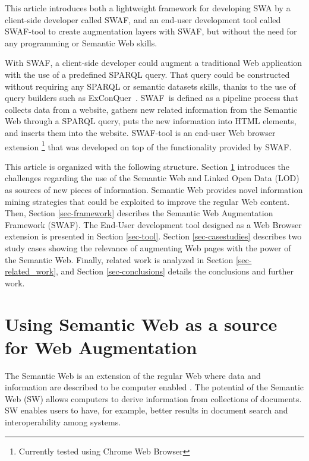 \documentclass[runningheads]{llncs}
\newcommand{\SWAT}{SWAF}
\begin{document}
This article introduces both a lightweight framework for developing SWA by a client-side developer called SWAF, and an end-user development tool called SWAF-tool to create augmentation layers with SWAF, but without the need for any programming or Semantic Web skills.

With \SWAT, a client-side developer could augment a traditional Web application with the use of a predefined SPARQL query. That query could be constructed without requiring any SPARQL or semantic datasets skills, thanks to the use of query builders such as ExConQuer~\cite{Attard2017ExConQuerRe-use}. \SWAT~is defined as a pipeline process that collects data from a website, gathers new related information from the Semantic Web through a SPARQL query, puts the new information into HTML elements, and inserts them into the website. SWAF-tool is an end-user Web browser extension \footnote{Currently tested using Chrome Web Browser} that was developed on top of the functionality provided by SWAF.


This article is organized with the following structure. Section \ref{sec-challenges} introduces the challenges regarding the use of the Semantic Web and Linked Open Data (LOD) as sources of new pieces of information. Semantic Web provides novel information mining strategies that could be exploited to improve the regular Web content. Then, Section \ref{sec-framework} describes the Semantic Web Augmentation Framework (SWAF). The End-User development tool designed as a Web Browser extension is presented in Section \ref{sec-tool}. Section \ref{sec-casestudies} describes two study cases showing the relevance of augmenting Web pages with the power of the Semantic Web. Finally, related work is analyzed in Section \ref{sec-related_work}, and Section \ref{sec-conclusions} details the conclusions and further work. 


\section{Using Semantic Web as a source for Web Augmentation}
\label{sec-challenges}

The Semantic Web is an extension of the regular Web where data and information are described to be computer enabled \cite{Berners-Lee2001TheWeb,Shadbolt2006TheRevisited}.  The potential of the Semantic Web (SW) allows computers to derive information from collections of documents. SW enables users to have, for example, better results in document search and interoperability among systems. 
\end{document}
